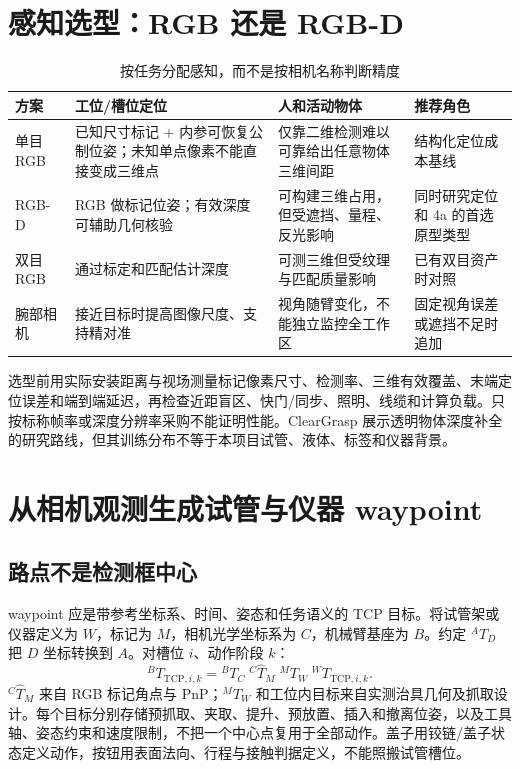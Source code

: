 \section{感知选型：RGB 还是 RGB-D}

\begin{table}[H]
\centering
\caption{按任务分配感知，而不是按相机名称判断精度}
\begin{tabularx}{\textwidth}{L{2.3cm}YYY}
\toprule
方案 & 工位/槽位定位 & 人和活动物体 & 推荐角色 \\
\midrule
单目 RGB & 已知尺寸标记 + 内参可恢复公制位姿；未知单点像素不能直接变成三维点 & 仅靠二维检测难以可靠给出任意物体三维间距 & 结构化定位成本基线 \\
RGB-D & RGB 做标记位姿；有效深度可辅助几何核验 & 可构建三维占用，但受遮挡、量程、反光影响 & 同时研究定位和 4a 的首选原型类型 \\
双目 RGB & 通过标定和匹配估计深度 & 可测三维但受纹理与匹配质量影响 & 已有双目资产时对照 \\
腕部相机 & 接近目标时提高图像尺度、支持精对准 & 视角随臂变化，不能独立监控全工作区 & 固定视角误差或遮挡不足时追加 \\
\bottomrule
\end{tabularx}
\end{table}


选型前用实际安装距离与视场测量标记像素尺寸、检测率、三维有效覆盖、末端定位误差和端到端延迟，再检查近距盲区、快门/同步、照明、线缆和计算负载。只按标称帧率或深度分辨率采购不能证明性能。ClearGrasp 展示透明物体深度补全的研究路线\cite{sajjan2020cleargrasp}，但其训练分布不等于本项目试管、液体、标签和仪器背景。

\section{从相机观测生成试管与仪器 waypoint}

\subsection{路点不是检测框中心}

waypoint 应是带参考坐标系、时间、姿态和任务语义的 TCP 目标。将试管架或仪器定义为 $W$，标记为 $M$，相机光学坐标系为 $C$，机械臂基座为 $B$。约定 ${}^{A}T_D$ 把 $D$ 坐标转换到 $A$。对槽位 $i$、动作阶段 $k$：
\begin{equation}
{}^{B}T_{\mathrm{TCP},i,k}
= {}^{B}T_C\;{}^{C}\hat T_M\;{}^{M}T_W\;{}^{W}T_{\mathrm{TCP},i,k} .
\end{equation}
$ {}^{C}\hat T_M$ 来自 RGB 标记角点与 PnP；$ {}^{M}T_W$ 和工位内目标来自实测治具几何及抓取设计。每个目标分别存储预抓取、夹取、提升、预放置、插入和撤离位姿，以及工具轴、姿态约束和速度限制，不把一个中心点复用于全部动作。盖子用铰链/盖子状态定义动作，按钮用表面法向、行程与接触判据定义，不能照搬试管槽位。

